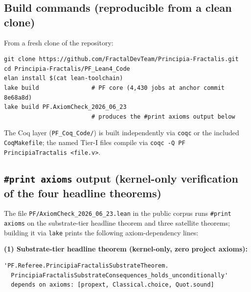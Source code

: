 \documentclass[11pt,a4paper]{amsart}
\theoremstyle{plain}
\theoremstyle{definition}
\begin{document}
\subsection{Build commands (reproducible from a clean clone)}\label{subsec:repro-build}

From a fresh clone of the repository:

\begin{verbatim}
git clone https://github.com/FractalDevTeam/Principia-Fractalis.git
cd Principia-Fractalis/PF_Lean4_Code
elan install $(cat lean-toolchain)
lake build               # PF core (4,430 jobs at anchor commit 8e68a8d)
lake build PF.AxiomCheck_2026_06_23
                         # produces the #print axioms output below
\end{verbatim}

The Coq layer (\texttt{PF\_Coq\_Code/}) is built independently via \texttt{coqc} or the included \texttt{CoqMakefile}; the named Tier-I files compile via \texttt{coqc -Q PF PrincipiaTractalis <file.v>}.

\subsection{\texttt{\#print axioms} output (kernel-only verification of the four headline theorems)}\label{subsec:repro-axioms}

The file \texttt{PF/AxiomCheck\_2026\_06\_23.lean} in the public corpus runs \texttt{\#print axioms} on the substrate-tier headline theorem and three satellite theorems; building it via \texttt{lake} prints the following axiom-dependency lines:

\smallskip
\textbf{(1) Substrate-tier headline theorem (kernel-only, zero project axioms):}
\begin{verbatim}
'PF.Referee.PrincipiaFractalisSubstrateTheorem.
  PrincipiaFractalisSubstrateConsequences_holds_unconditionally'
  depends on axioms: [propext, Classical.choice, Quot.sound]
\end{verbatim}
\end{document}
